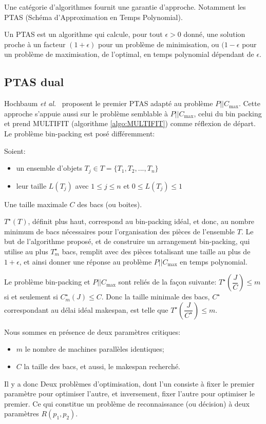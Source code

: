 \documentclass[a4paper,12pt]{report}
\theoremstyle{plain}				%
\theoremstyle{definition}				%
\newcommand\problemGrahamP{$P||C_{\max}$\xspace}
\begin{document}
Une catégorie d'algorithmes fournit une garantie d'approche.
Notamment les PTAS (Schéma d'Approximation en Temps Polynomial).

Un PTAS est un algorithme qui calcule, pour tout $\epsilon > 0$ donné,
une solution proche à un facteur $(1+\epsilon)$ pour un problème de
minimisation, ou $(1-\epsilon$ pour un problème de maximisation, de
l'optimal, en temps polynomial dépendant de $\epsilon$.


\subsection{PTAS dual} %

Hochbaum \emph{et al.}\ \cite{hochbaum1987using} proposent le
premier PTAS adapté au problème \problemGrahamP.
Cette approche s'appuie aussi sur le problème semblable à
\problemGrahamP, celui du bin packing et prend MULTIFIT
(algorithme \ref{algo:MULTIFIT}) comme réflexion de départ.
Le problème bin-packing est posé différemment:

Soient:
\begin{itemize}
\item un ensemble d'objets $T_j \in T = \{T_1, T_2, ..., T_n\}$
\item leur taille $L(T_j)$ avec $1 \le j \le n$ et $0 \le L(T_j) \le 1$
\end{itemize}
Une taille maximale $C$ des bacs (ou boites).

$T^{\star}(T)$, définit plus haut, correspond au bin-packing idéal, et donc,
au nombre minimum de bacs nécessaires pour l'organisation des pièces de l'ensemble $T$.
Le but de l'algorithme proposé, et de construire un arrangement bin-packing,
qui utilise au plus $T^{\star}_m$ bacs, remplit
avec des pièces totalisant une taille au plus de $1+ \epsilon$,
et ainsi donner une réponse au problème \problemGrahamP en temps polynomial.

Le problème bin-packing et \problemGrahamP sont reliés de la façon suivante:
$T^{\star}(\dfrac{J}{C}) \le m$ si et seulement si $C^{\star}_m(J) \le C$.
Donc la taille minimale des bacs, $C^{\star}$ correspondant au délai idéal makespan, est telle que $T^{\star}(\dfrac{J}{C^{\star}}) \le m$.

Nous sommes en présence de deux paramètres critiques:
\begin{itemize}
\item $m$ le nombre de machines parallèles identiques;
\item $C$ la taille des bacs, et aussi, le makespan recherché.
\end{itemize}
Il y a donc Deux problèmes d'optimisation,
dont l'un consiste à fixer le premier paramètre pour optimiser l'autre,
et inversement, fixer l'autre pour optimiser le premier.
Ce qui constitue un problème de reconnaissance (ou décision) à deux paramètres $R(p_1, p_2)$.
\end{document}
